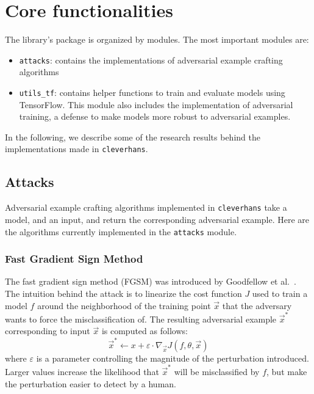 \section{Core functionalities}
\label{sec:core}

The library's package is organized by modules. The most important modules are:
\begin{itemize} \item \texttt{attacks}: contains the implementations of
adversarial example crafting algorithms \item \texttt{utils\_tf}: contains
helper functions to train and evaluate models using TensorFlow. This module also
includes the implementation of adversarial training, a defense to make models
more robust to adversarial examples. \end{itemize}

In the following, we describe some of the research results behind the
implementations made in \texttt{cleverhans}.

\subsection{Attacks}

Adversarial example crafting algorithms implemented in \texttt{cleverhans} take
a model, and an input, and return the corresponding adversarial example. Here
are the algorithms currently implemented in the \texttt{attacks} module.

\subsubsection{Fast Gradient Sign Method} \label{sec:fgsm}

The fast gradient sign method (FGSM) was introduced by Goodfellow et
al.~\cite{goodfellow2014explaining}. The intuition behind the attack is to
linearize the cost function $J$ used to train a model $f$ around the
neighborhood of the training point $\vec{x}$ that the adversary wants to force
the misclassification of. The resulting adversarial example $\vec{x}^*$
corresponding to input $\vec{x}$ is computed as follows: \begin{equation}
\vec{x}^* \leftarrow x + \varepsilon \cdot \nabla_{\vec{x}}J(f, \theta, \vec{x})
\end{equation} where $\varepsilon$ is a parameter controlling the magnitude of
the perturbation introduced. Larger values increase the likelihood that
$\vec{x}^*$ will be misclassified by $f$, but make the perturbation easier to
detect by a human.

